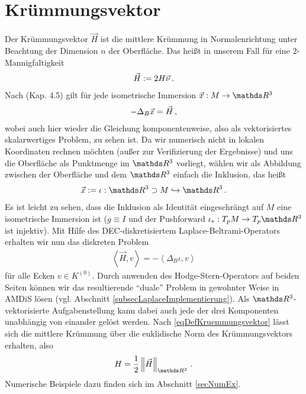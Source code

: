 \section{Krümmungsvektor}
  Der Krümmungsvektor \( \vec{H} \) ist die mittlere Krümmung in Normalenrichtung unter Beachtung der Dimension \( n \) der Oberfläche.
  Das heißt in unserem Fall für eine \( 2 \)-Mannigfaltigkeit
  \begin{align}
    \label{eqDefKruemmungsvektor}
    \vec{H} := 2 H \vec{\nu} \,\text{.}
  \end{align}
  Nach \cite{chen} (Kap. 4.5) gilt für jede isometrische Immersion \( \vec{x}:M\rightarrow \R^{3} \)
  \begin{align}
    -\Delta_{B}\vec{x} = \vec{H} \,\text{,}
  \end{align}
  wobei auch hier wieder die Gleichung komponentenweise, also als vektorisiertes skalarwertiges Problem, zu sehen ist.
  Da wir numerisch nicht in lokalen Koordinaten rechnen möchten (außer zur Verifizierung der Ergebnisse) und uns die Oberfläche als
  Punktmenge im \( \R^{3} \) vorliegt, wählen wir als Abbildung zwischen der Oberfläche und dem \( \R^{3} \) einfach die Inklusion, das heißt
  \begin{align}
    \vec{x}:= \iota: \R^{3}\supset M \hookrightarrow \R^{3} \formpunkt
  \end{align}
  Es ist leicht zu sehen, dass die Inklusion als Identität eingeschrängt auf \( M \) eine isometrische Immersion ist 
  (\( g\equiv I \) und der Pushforward \( \iota_{*}:T_{p}M \rightarrow T_{p}\R^{3} \) ist injektiv).
  Mit Hilfe des DEC-diskretisiertem Laplace-Beltrami-Operators erhalten wir nun das diskreten Problem
  \begin{align}
    \left\langle \vec{H}, v \right\rangle = - \left\langle \Delta_{B}\iota , v \right\rangle
  \end{align}
  für alle Ecken \( v\in K^{(0)} \).
  Durch anwenden des Hodge-Stern-Operators auf beiden Seiten können wir das resultierende "`duale"' Problem in gewohnter Weise in AMDiS
  lösen (vgl. Abschnitt \ref{subsecLaplaceImplementierung}).
  Als \( \R^{3} \)-vektorisierte Aufgabenstellung kann dabei auch jede der drei Komponenten unabhängig von einander gelöst werden.
  Nach \eqref{eqDefKruemmungsvektor} lässt sich die mittlere Krümmung über die euklidische Norm des Krümmungsvektors erhalten, also
  \begin{align}
    H = \frac{1}{2}\left\| \vec{H} \right\|_{\R^{3}} \formpunkt
  \end{align}
  Numerische Beispiele dazu finden sich im Abschnitt \ref{secNumEx}.

